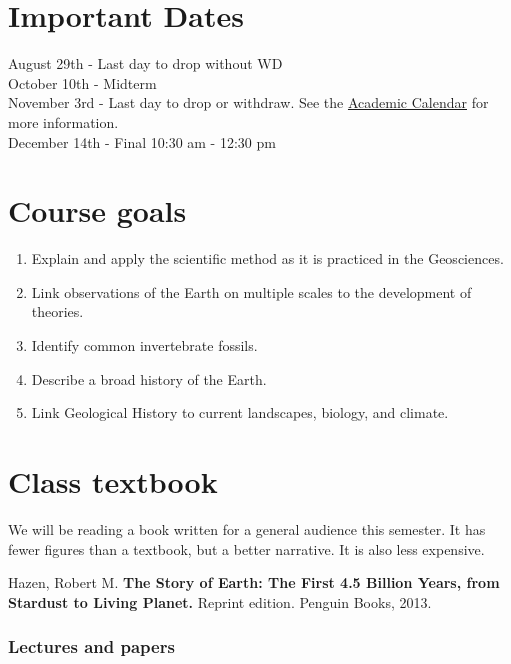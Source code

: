 \documentclass[11pt,]{article}
\providecommand{\tightlist}{%
  \setlength{\itemsep}{0pt}\setlength{\parskip}{0pt}}
\begin{document}
\hypertarget{important-dates}{%
\section{Important Dates}\label{important-dates}}

August 29th - Last day to drop without WD\\
October 10th - Midterm\\
November 3rd - Last day to drop or withdraw. See the
\href{https://www.southalabama.edu/academiccalendar/}{Academic Calendar}
for more information.\\
December 14th - Final 10:30 am - 12:30 pm\\

\hypertarget{course-goals}{%
\section{Course goals}\label{course-goals}}

\begin{enumerate}
\def\labelenumi{\arabic{enumi}.}
\tightlist
\item
  Explain and apply the scientific method as it is practiced in the
  Geosciences.
\item
  Link observations of the Earth on multiple scales to the development
  of theories.
\item
  Identify common invertebrate fossils.
\item
  Describe a broad history of the Earth.
\item
  Link Geological History to current landscapes, biology, and climate.
\end{enumerate}

\hypertarget{class-textbook}{%
\section{Class textbook}\label{class-textbook}}

We will be reading a book written for a general audience this semester.
It has fewer figures than a textbook, but a better narrative. It is also
less expensive.

Hazen, Robert M. \textbf{The Story of Earth: The First 4.5 Billion
Years, from Stardust to Living Planet.} Reprint edition. Penguin Books,
2013.

\hypertarget{lectures-and-papers}{%
\subsubsection{Lectures and papers}\label{lectures-and-papers}}
\end{document}
